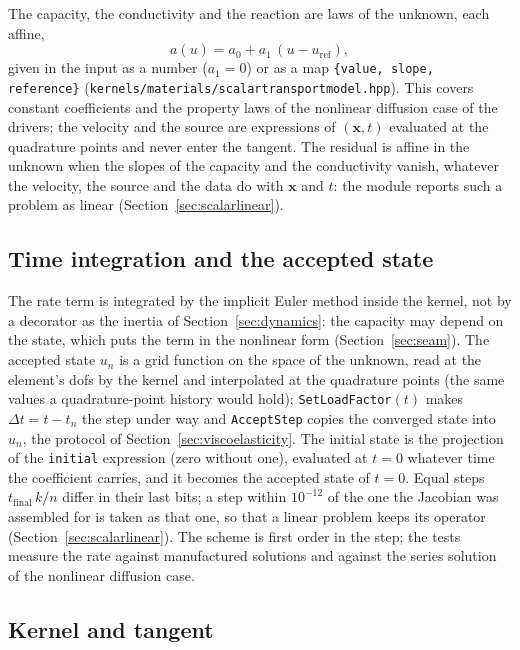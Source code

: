 \documentclass[11pt]{article}
\newcommand{\bx}{\bm{x}}
\DeclareRobustCommand{\code}[1]{{\def\_{\textunderscore\allowbreak}\texttt{#1}}}
\DeclareRobustCommand{\file}[1]{{\def\_{\textunderscore\allowbreak}\texttt{#1}}}
\begin{document}
The capacity, the conductivity and the reaction are laws of the unknown,
each affine,
\begin{equation}
  a(u) = a_0 + a_1\,(u - u_{\mathrm{ref}}),
\end{equation}
given in the input as a number ($a_1 = 0$) or as a map
\code{\{value, slope, reference\}} (\file{kernels/materials/scalar\_transport\_model.hpp}).
This covers constant coefficients and the property laws of the nonlinear
diffusion case of the drivers; the velocity and the source are expressions
of $(\bx, t)$ evaluated at the quadrature points and never enter the
tangent.  The residual is affine in the unknown when the slopes of the
capacity and the conductivity vanish, whatever the velocity, the source and
the data do with $\bx$ and $t$: the module reports such a problem as linear
(Section~\ref{sec:scalarlinear}).

\subsection{Time integration and the accepted state}

The rate term is integrated by the implicit Euler method inside the kernel,
not by a decorator as the inertia of Section~\ref{sec:dynamics}: the
capacity may depend on the state, which puts the term in the nonlinear
form (Section~\ref{sec:seam}).  The accepted state $u_n$ is a grid function
on the space of the unknown, read at the element's dofs by the kernel and
interpolated at the quadrature points (the same values a quadrature-point
history would hold); \code{SetLoadFactor}$(t)$ makes $\Delta t = t - t_n$
the step under way and \code{AcceptStep} copies the converged state into
$u_n$, the protocol of Section~\ref{sec:viscoelasticity}.  The initial
state is the projection of the \code{initial} expression (zero without
one), evaluated at $t = 0$ whatever time the coefficient carries, and it
becomes the accepted state of $t = 0$.  Equal steps $t_{\text{final}}\,k/n$
differ in their last bits; a step within $10^{-12}$ of the one the
Jacobian was assembled for is taken as that one, so that a linear problem
keeps its operator (Section~\ref{sec:scalarlinear}).  The scheme is first
order in the step; the tests measure the rate against manufactured
solutions and against the series solution of the nonlinear diffusion
case.

\subsection{Kernel and tangent}
\end{document}
